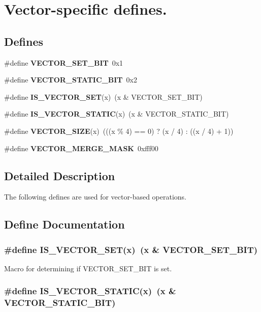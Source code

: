 \section{Vector-specific defines.}
\label{group__vector__defs}
\subsection*{Defines}
\begin{CompactItemize}
\item 
\#define {\bf VECTOR\_\-SET\_\-BIT}\ 0x1
\item 
\#define {\bf VECTOR\_\-STATIC\_\-BIT}\ 0x2
\item 
\#define {\bf IS\_\-VECTOR\_\-SET}(x)\ (x \& VECTOR\_\-SET\_\-BIT)
\item 
\#define {\bf IS\_\-VECTOR\_\-STATIC}(x)\ (x \& VECTOR\_\-STATIC\_\-BIT)
\item 
\#define {\bf VECTOR\_\-SIZE}(x)\ (((x \% 4) == 0) ? (x / 4) : ((x / 4) + 1))
\item 
\#define {\bf VECTOR\_\-MERGE\_\-MASK}\ 0xfff00
\end{CompactItemize}


\subsection{Detailed Description}
The following defines are used for vector-based operations. 

\subsection{Define Documentation}
\subsubsection{\setlength{\rightskip}{0pt plus 5cm}\#define IS\_\-VECTOR\_\-SET(x)\ (x \& VECTOR\_\-SET\_\-BIT)}\label{group__vector__defs_a2}


Macro for determining if VECTOR\_\-SET\_\-BIT is set. 
\subsubsection{\setlength{\rightskip}{0pt plus 5cm}\#define IS\_\-VECTOR\_\-STATIC(x)\ (x \& VECTOR\_\-STATIC\_\-BIT)}\label{group__vector__defs_a3}


